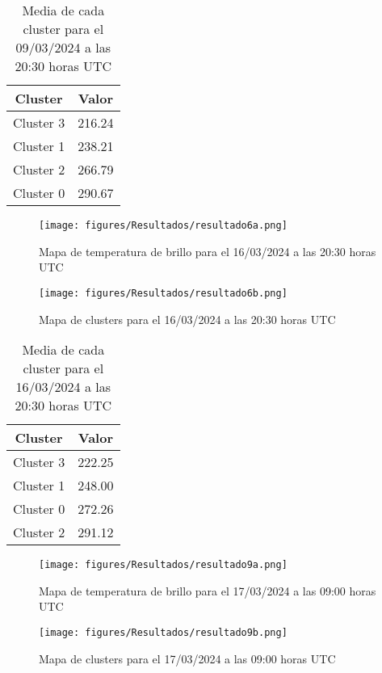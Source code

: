 \documentclass[twocolumn]{IECEjournal} %
\begin{document}
\begin{table}[h!]
    \centering
    \label{tab9}
    \begin{tabular}{|c|c|}
    \hline
    \textbf{Cluster} & \textbf{Valor} \\
    \hline
    Cluster 3 & 216.24 \\
    Cluster 1 & 238.21 \\
    Cluster 2 & 266.79 \\
    Cluster 0 & 290.67 \\
    \hline
    \end{tabular}
    \caption{Media de cada cluster para el 09/03/2024 a las 20:30 horas UTC}
\end{table}

\begin{figure}[H]
	\centering
	\texttt{[image: figures/Resultados/resultado6a.png]}
	\caption{Mapa de temperatura de brillo para el 16/03/2024 a las 20:30 horas UTC}
	\label{fig16}
\end{figure}

\begin{figure}[H]
	\centering
	\texttt{[image: figures/Resultados/resultado6b.png]}
	\caption{Mapa de clusters para el 16/03/2024 a las 20:30 horas UTC}
	\label{fig17}
\end{figure}

\begin{table}[h!]
    \centering
    \label{tab10}
    \begin{tabular}{|c|c|}
    \hline
    \textbf{Cluster} & \textbf{Valor} \\
    \hline
    Cluster 3 & 222.25 \\
    Cluster 1 & 248.00 \\
    Cluster 0 & 272.26 \\
    Cluster 2 & 291.12 \\
    \hline
    \end{tabular}
    \caption{Media de cada cluster para el 16/03/2024 a las 20:30 horas UTC}
\end{table}


\begin{figure}[H]
	\centering
	\texttt{[image: figures/Resultados/resultado9a.png]}
	\caption{Mapa de temperatura de brillo para el 17/03/2024 a las 09:00 horas UTC}
	\label{fig18}
\end{figure}

\begin{figure}[H]
	\centering
	\texttt{[image: figures/Resultados/resultado9b.png]}
	\caption{Mapa de clusters para el 17/03/2024 a las 09:00 horas UTC}
	\label{fig19}
\end{figure}
\end{document}
